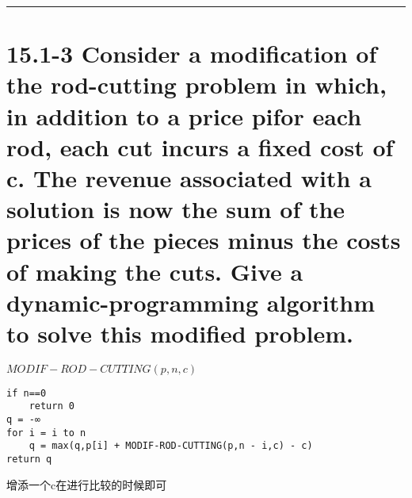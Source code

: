 \documentclass{thuemp}
\begin{document}


\maketitle

\noindent\rule[0.25\baselineskip]{\textwidth}{1pt}
\wuhao 

\section*{15.1-3 Consider a modification of the rod-cutting problem in which, in addition to a price pifor each rod, each cut incurs a fixed cost of c. The revenue associated with a solution is now the sum of the prices of the pieces minus the costs of making the cuts. Give a dynamic-programming algorithm to solve this modified problem.}

${MODIF-ROD-CUTTING(p,n,c) }$
\begin{lstlisting}
if n==0
	return 0
q = -∞
for i = i to n
	q = max(q,p[i] + MODIF-ROD-CUTTING(p,n - i,c) - c)
return q
\end{lstlisting}
增添一个c在进行比较的时候即可
\end{document}
